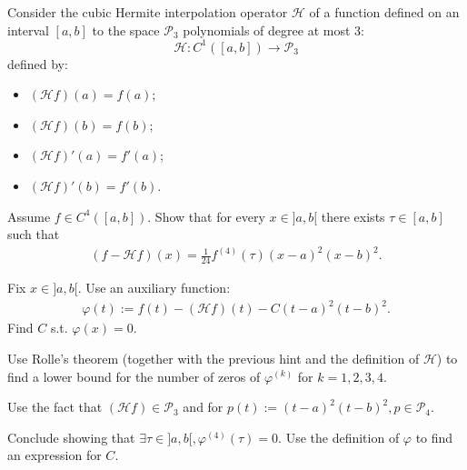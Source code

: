 \begin{problem}
 
 Consider the cubic Hermite interpolation operator $\mathcal{H}$ of a function defined on an interval $[a,b]$ to the space  $\mathcal{P}_3$ polynomials of degree at most $3$:
 \[
  \mathcal{H}: C^1([a,b]) \rightarrow \mathcal{P}_3
 \]
defined by:
\begin{itemize}
 \item $(\mathcal{H}f)(a) = f(a)$;
 \item $(\mathcal{H}f)(b) = f(b)$;
 \item $(\mathcal{H}f)'(a) = f'(a)$;
 \item $(\mathcal{H}f)'(b) = f'(b)$.
\end{itemize}
Assume $f \in C^4([a,b])$. Show that for every $x \in ]a,b[$ there exists $\tau \in [a,b]$ such that\begin{align}
 (f - \mathcal{H}f)(x) = \frac{1}{24} f^{(4)}(\tau) (x - a)^2(x-b)^2.
\end{align}

\begin{hint}
 Fix $x \in ]a,b[$. Use an auxiliary function:
 \begin{align}
  \varphi(t) := f(t) - (\mathcal{H}f)(t) - C (t-a)^2(t-b)^2.
 \end{align}
 Find $C$ s.t. $\varphi(x) = 0$.
\end{hint}

\begin{hint}
 Use Rolle's theorem (together with the previous hint and the definition of $\mathcal{H}$) to find a lower bound for the number of zeros of $\varphi^{(k)}$ for $k = 1,2,3,4$.
\end{hint}

\begin{hint}
 Use the fact that $(\mathcal{H}f) \in \mathcal{P}_3$ and for $p(t) := (t - a)^2(t - b)^2, p \in \mathcal{P}_4$.
\end{hint}


\begin{hint}
 Conclude showing that $\exists \tau \in ]a,b[, \varphi^{(4)}(\tau) = 0$. Use the definition of $\varphi$ to find an expression for $C$.
\end{hint}



\end{problem}
